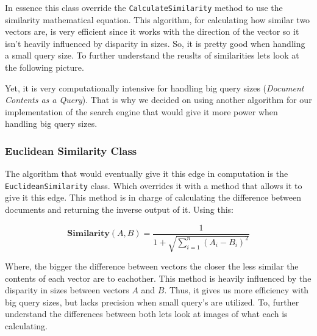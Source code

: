 \documentclass{article}
\begin{document}
\indent In essence this class override the \texttt{CalculateSimilarity} method to use the similarity mathematical equation. This algorithm, for calculating how similar two vectors are, is very efficient since it works with the direction of the vector so it isn't heavily influenced by disparity in sizes. So, it is pretty good when handling a small query size. To further understand the reuslts of similarities lets look at the following picture.

Yet, it is very computationally intensive for handling big query sizes (\textit{Document Contents as a Query}). That is why we decided on using another algorithm for our implementation of the search engine that would give it more power when handling big query sizes. 

\subsubsection{Euclidean Similarity Class}
The algorithm that would eventually give it this edge in computation is the \texttt{EuclideanSimilarity} class. Which overrides it with a method that allows it to give it this edge. This method is in charge of calculating the difference between documents and returning the inverse output of it. Using this:

\begin{center}
    \[
    \textbf{Similarity}(A, B) = \frac{1}{1 + \sqrt{\sum_{i=1}^{n} (A_i - B_i)^2}}
    \]
\end{center}

\indent Where, the bigger the difference between vectors the closer the less similar the contents of each vector are to eachother. This method is heavily influenced by the disparity in sizes between vectors $A$ and $B$. Thus, it gives us more efficiency with big query sizes, but lacks precision when small query's are utilized. To, further understand the differences between both lets look at images of what each is calculating.
\end{document}
